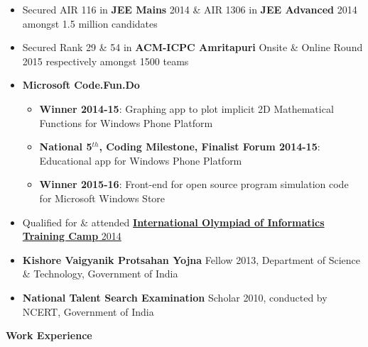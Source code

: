 \documentclass[letterpaper,11pt]{article}
\begin{document}
{\begin{itemize}
    \item Secured AIR 116 in \textbf{JEE Mains} 2014 \& AIR 1306 in \textbf{JEE Advanced} 2014 amongst 1.5 million candidates
    \vspace{-5pt}
    \item Secured Rank 29 \& 54 in \textbf{ACM-ICPC Amritapuri} Onsite \& Online Round 2015 respectively amongst 1500 teams
    \vspace{-5pt}
    \item \textbf{Microsoft Code.Fun.Do}
        \vspace{-5pt}
        \begin{itemize}
            \item \textbf{Winner 2014-15}: Graphing app to plot implicit 2D Mathematical Functions for Windows Phone Platform
            \vspace{-2pt}
            \item \textbf{National 5$^{th}$, Coding Milestone, Finalist Forum 2014-15}: Educational app for Windows Phone Platform
            \vspace{-2pt}
            \item \textbf{Winner 2015-16}: Front-end for open source program simulation code for Microsoft Windows Store
            \vspace{-2pt}
        \end{itemize}
    \vspace{-5pt}
    \item Qualified for \& attended \href{http://www.iarcs.org.in/inoi/2014/inoi2014/results_inoi2014.php}{\textbf{International Olympiad of Informatics Training Camp} 2014}
    \vspace{-5pt}
    \item \textbf{Kishore Vaigyanik Protsahan Yojna} Fellow 2013, Department of Science \& Technology, Government of India
    \vspace{-5pt}
    \item \textbf{National Talent Search Examination} Scholar 2010, conducted by NCERT, Government of India
\end{itemize}

\vspace{-1pt}
\Large{\textbf{Work Experience}}
\small
\vspace{-5pt}

}
\end{document}
